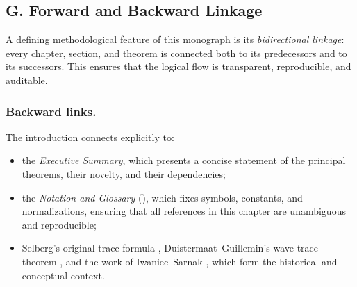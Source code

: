 
\subsection*{G. Forward and Backward Linkage}

A defining methodological feature of this monograph is its \emph{bidirectional linkage}:
every chapter, section, and theorem is connected both to its predecessors and to its successors.
This ensures that the logical flow is transparent, reproducible, and auditable.

\subsubsection*{Backward links.}
The introduction connects explicitly to:
\begin{itemize}
  \item the \emph{Executive Summary}, which presents a concise statement of the principal theorems,
        their novelty, and their dependencies;
  \item the \emph{Notation and Glossary} (),
        which fixes symbols, constants, and normalizations, ensuring that all references in this chapter
        are unambiguous and reproducible;
  \item Selberg’s original trace formula \cite{Selberg1956}, Duistermaat–Guillemin’s wave-trace theorem \cite{DG1975},
        and the work of Iwaniec–Sarnak \cite{Iwaniec2002}, which form the historical and conceptual context.
\end{itemize}

